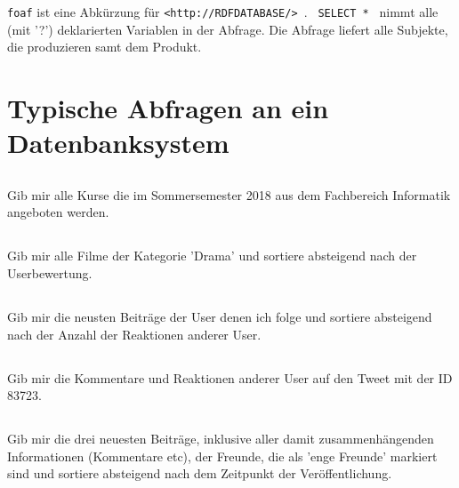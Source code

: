 \texttt{foaf} ist eine Abkürzung für \texttt{<http://RDFDATABASE/>
}. \texttt{ SELECT * } nimmt alle (mit '?') deklarierten Variablen in der Abfrage. Die Abfrage liefert alle Subjekte, die produzieren samt dem Produkt.


\section{Typische Abfragen an ein Datenbanksystem}
\subsection{}
Gib mir alle Kurse die im Sommersemester 2018 aus dem Fachbereich Informatik angeboten werden.

\subsection{}
Gib mir alle Filme der Kategorie 'Drama' und sortiere absteigend nach der Userbewertung.

\subsection{}
Gib mir die neusten Beiträge der User denen ich folge und sortiere absteigend nach der Anzahl der Reaktionen anderer User.

\subsection{}
Gib mir die Kommentare und Reaktionen anderer User auf den Tweet mit der ID 83723.

\subsection{}
Gib mir die drei neuesten Beiträge, inklusive aller damit zusammenhängenden Informationen (Kommentare etc), der Freunde, die als 'enge Freunde' markiert sind und sortiere absteigend nach dem Zeitpunkt der Veröffentlichung.

\printbibliography %


